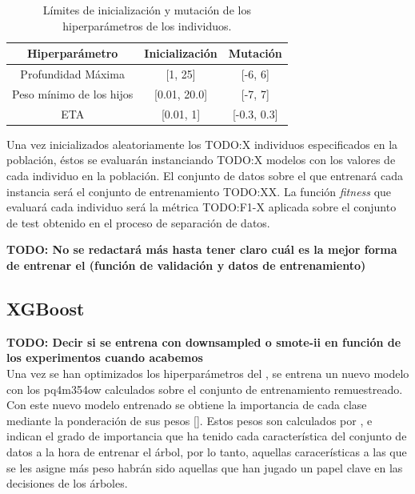         \begin{table}[H]
            \centering
                \begin{tabular}{ |c|c|c| } 
                \hline
                \textbf{Hiperparámetro} & \textbf{Inicialización} & \textbf{Mutación}\\
                \hline
                    Profundidad Máxima & [1, 25] & [-6, 6]\\ 
                    Peso mínimo de los hijos & [0.01, 20.0] & [-7, 7] \\ 
                    ETA & [0.01, 1] &  [-0.3, 0.3] \\ 
                \hline

                \end{tabular}

            \caption{Límites de inicialización y mutación de los hiperparámetros de los individuos.}
            \label{InitAndMutationLimitsHyperparamsTable}
        \end{table}

        Una vez inicializados aleatoriamente los TODO:X individuos especificados en la población, éstos se evaluarán instanciando TODO:X modelos  con los valores de cada individuo en la población. El conjunto de datos sobre el que entrenará cada instancia  será el conjunto de entrenamiento TODO:XX. La función \textit{fitness} que evaluará cada individuo será la métrica TODO:F1-X aplicada sobre el conjunto de test obtenido en el proceso de separación de datos.

        \textbf{TODO: No se redactará más hasta tener claro cuál es la mejor forma de entrenar el  (función de validación y datos de entrenamiento)}






    \subsection{XGBoost}


        \textbf{TODO: Decir si se entrena con downsampled o smote-ii en función de los experimentos cuando acabemos}\\

        Una vez se han optimizados los hiperparámetros del , se entrena un nuevo modelo con los pq4m354ow calculados sobre el conjunto de entrenamiento remuestreado. Con este nuevo modelo  entrenado se obtiene la importancia de cada clase mediante la ponderación de sus pesos [\cite{XGBoostFeatureWeightsMeaning}]. Estos pesos son calculados por , e indican el grado de importancia que ha tenido cada característica del conjunto de datos a la hora de entrenar el árbol, por lo tanto, aquellas caracerísticas a las que se les asigne más peso habrán sido aquellas que han jugado un papel clave en las decisiones de los árboles.

